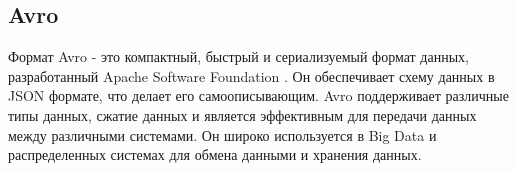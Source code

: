 \subsection{Avro}
Формат Avro - это компактный, быстрый и сериализуемый формат данных, разработанный
Apache Software Foundation . Он обеспечивает схему данных в JSON формате, что делает его самоописывающим. Avro поддерживает различные типы данных, сжатие данных и является эффективным для передачи данных между различными системами. Он широко используется в Big Data и распределенных системах для обмена данными и хранения данных.
